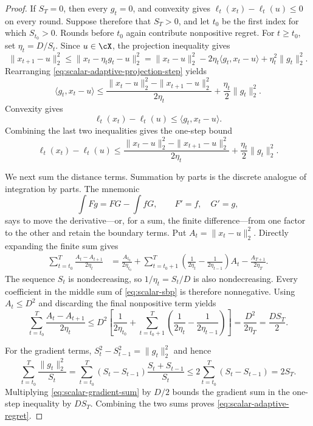 \documentclass[11pt,twoside]{article}
\theoremstyle{definition}
\theoremstyle{remark}
\begin{document}
\begin{proof}
If $S_T=0$, then every $g_t=0$, and convexity gives
$\ell_t(x_t)-\ell_t(u)\le0$ on every round. Suppose therefore that $S_T>0$,
and let $t_0$ be the first index for which $S_{t_0}>0$. Rounds before $t_0$
again contribute nonpositive regret. For $t\ge t_0$, set
$\eta_t=D/S_t$. Since $u\in\cX$, the projection inequality gives
\begin{equation}
 \|x_{t+1}-u\|_2^2
 \le \|x_t-\eta_tg_t-u\|_2^2
 =\|x_t-u\|_2^2
   -2\eta_t\langle g_t,x_t-u\rangle
   +\eta_t^2\|g_t\|_2^2.
 \label{eq:scalar-adaptive-projection-step}
\end{equation}
Rearranging \cref{eq:scalar-adaptive-projection-step} yields
\begin{equation}
 \langle g_t,x_t-u\rangle
 \le
 \frac{\|x_t-u\|_2^2-\|x_{t+1}-u\|_2^2}{2\eta_t}
 +\frac{\eta_t}{2}\|g_t\|_2^2.
 \label{eq:scalar-adaptive-inner-product-step}
\end{equation}
Convexity gives
\[
 \ell_t(x_t)-\ell_t(u)\le\langle g_t,x_t-u\rangle.
\]
Combining the last two inequalities gives the one-step bound
\[
 \ell_t(x_t)-\ell_t(u)
 \le \frac{\|x_t-u\|_2^2-\|x_{t+1}-u\|_2^2}{2\eta_t}
      +\frac{\eta_t}{2}\|g_t\|_2^2.
\]

We next sum the distance terms. Summation by parts is the discrete analogue
of integration by parts. The mnemonic
\[
 \int Fg=FG-\int fG,
 \qquad F'=f,\quad G'=g,
\]
says to move the derivative---or, for a sum, the finite difference---from one
factor to the other and retain the boundary terms. Put
$A_t=\|x_t-u\|_2^2$. Directly expanding the finite sum gives
\begin{align}
 \sum_{t=t_0}^T\frac{A_t-A_{t+1}}{2\eta_t}
 &=\frac{A_{t_0}}{2\eta_{t_0}}
   +\sum_{t=t_0+1}^T
    \left(\frac1{2\eta_t}-\frac1{2\eta_{t-1}}\right)A_t
   -\frac{A_{T+1}}{2\eta_T}.                       \label{eq:scalar-sbp}
\end{align}
The sequence $S_t$ is nondecreasing, so $1/\eta_t=S_t/D$ is also
nondecreasing. Every coefficient in the middle sum of
\cref{eq:scalar-sbp} is therefore nonnegative. Using $A_t\le D^2$ and
discarding the final nonpositive term yields
\begin{equation}
 \sum_{t=t_0}^T\frac{A_t-A_{t+1}}{2\eta_t}
 \le D^2\left[
       \frac1{2\eta_{t_0}}
       +\sum_{t=t_0+1}^T
        \left(\frac1{2\eta_t}-\frac1{2\eta_{t-1}}\right)
      \right]
 =\frac{D^2}{2\eta_T}
  =\frac{DS_T}{2}.                                  \label{eq:scalar-distance-sum}
\end{equation}

For the gradient terms, $S_t^2-S_{t-1}^2=\|g_t\|_2^2$ and hence
\begin{equation}
 \sum_{t=t_0}^T\frac{\|g_t\|_2^2}{S_t}
 =\sum_{t=t_0}^T
   (S_t-S_{t-1})\frac{S_t+S_{t-1}}{S_t}
 \le2\sum_{t=t_0}^T(S_t-S_{t-1})
  =2S_T.                                             \label{eq:scalar-gradient-sum}
\end{equation}
Multiplying \cref{eq:scalar-gradient-sum} by $D/2$ bounds the gradient
sum in the one-step inequality by $DS_T$. Combining the two sums proves
\cref{eq:scalar-adaptive-regret}.
\end{proof}
\end{document}
